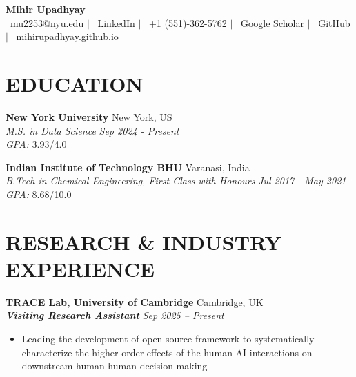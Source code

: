\documentclass[a4paper,11pt]{article}
\begin{document}
\begin{center}
    {\color{boldcolor}\textbf{\LARGE Mihir Upadhyay}} \\
    \vspace{0.3cm}
    {\scriptsize
    \faEnvelope \, \href{mailto:mu2253@nyu.edu}{\color{boldcolor}mu2253@nyu.edu} 
    \quad $\vert$ \quad
    \faLinkedin \, \href{https://www.linkedin.com/in/mihir-upadhyay-434364171/}{\color{boldcolor}LinkedIn} 
    \quad $\vert$ \quad
    \faPhone \, \color{boldcolor}+1 (551)-362-5762 
    \quad $\vert$ \quad
    \faGraduationCap \, \href{https://scholar.google.com/citations?user=2HXFgKMAAAAJ&hl=en}{\color{boldcolor}Google Scholar} 
    \quad $\vert$ \quad
    \faGithub \, \href{https://github.com/mihirupadhyay}{\color{boldcolor}GitHub} 
    \quad $\vert$ \quad
    \faHome \, \href{https://mihirupadhyay.github.io/}{\color{boldcolor}mihirupadhyay.github.io}
    }
    \vspace{0.2cm}
\end{center}
\vspace{-0.4cm}
\vspace{-0.2cm}
\section*{EDUCATION}
{\color{boldcolor}\textbf{New York University}} \hfill New York, US  \\  
\small \textit{M.S. in Data Science}  \hfill \textit{\small Sep 2024 - Present}\\ 
{\color{boldcolor}\textit{GPA:}{ 3.93/4.0}} \\

\vspace{-0.2cm}

{\color{boldcolor}\textbf{Indian Institute of Technology BHU}} \hfill Varanasi, India\\
\small \textit{B.Tech in Chemical Engineering, First Class with Honours} \hfill \textit{\small Jul 2017 - May 2021}\\
{\color{boldcolor}\textit{GPA:}{ 8.68/10.0}} \\
\vspace{-0.4cm}

\vspace{-0.08cm}
\vspace{-0.2cm}
\section*{RESEARCH \& INDUSTRY EXPERIENCE}

{\color{boldcolor}\textbf{TRACE Lab, University of Cambridge}} 
\hfill Cambridge, UK\\
{\color{lightboldcolor}\textbf{\textit{Visiting Research Assistant}}} \hfill \textit{\small Sep 2025 – Present}
\begin{itemize}
    \item Leading the development of open-source framework to systematically characterize the higher order effects of the human-AI interactions on downstream human-human decision making
\end{itemize}
\vspace{0.2cm}
\end{document}
